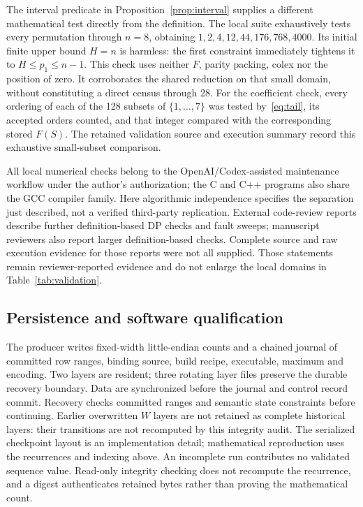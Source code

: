 \documentclass[11pt]{article}
\theoremstyle{definition}
\theoremstyle{remark}
\begin{document}
The interval predicate in Proposition~\ref{prop:interval} supplies a
different mathematical test directly from the definition. The local suite
exhaustively tests every permutation through $n=8$, obtaining
$1,2,4,12,44,176,768,4000$. Its initial finite upper bound $H=n$ is
harmless: the first constraint immediately tightens it to
$H\leq p_1\leq n-1$. This check uses neither $F$, parity packing, colex
nor the position of zero. It corroborates the shared reduction on that
small domain, without constituting a direct census through 28.
For the coefficient check, every ordering of each of the 128 subsets of
$\{1,\ldots,7\}$ was tested by~\eqref{eq:tail}, its accepted orders counted,
and that integer compared with the corresponding stored $F(S)$.
The retained validation source and execution summary record this exhaustive
small-subset comparison.

All local numerical checks belong to the OpenAI/Codex-assisted maintenance
workflow under the author's authorization; the C and C++ programs also
share the GCC compiler family. Here algorithmic independence specifies
the separation just described, not a verified third-party replication.
External code-review reports describe further definition-based DP checks
and fault sweeps; manuscript reviewers also report larger definition-based
checks. Complete source and raw execution evidence for those reports were
not all supplied. Those statements remain reviewer-reported evidence and
do not enlarge the local domains in Table~\ref{tab:validation}.

\subsection{Persistence and software qualification}

The producer writes fixed-width little-endian counts and a chained journal
of committed row ranges, binding source, build recipe, executable, maximum
and encoding. Two layers are resident; three rotating layer files preserve
the durable recovery boundary. Data are synchronized before the journal
and control record commit. Recovery checks committed ranges and semantic
state constraints before continuing. Earlier overwritten $W$ layers are
not retained as complete historical layers: their transitions are not
recomputed by this integrity audit. The serialized checkpoint layout is
an implementation detail; mathematical reproduction uses the recurrences
and indexing above. An incomplete run contributes no
validated sequence value. Read-only integrity checking does not recompute
the recurrence, and a digest authenticates retained bytes rather than
proving the mathematical count.
\end{document}
